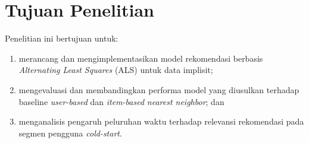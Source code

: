 \section{Tujuan Penelitian}
Penelitian ini bertujuan untuk:
\begin{enumerate}
  \item merancang dan mengimplementasikan model rekomendasi berbasis
    \emph{Alternating Least Squares} (ALS) untuk data implisit;
  \item mengevaluasi dan membandingkan performa model yang diusulkan
    terhadap baseline \emph{user-based} dan \emph{item-based} \emph{nearest
    neighbor}; dan
  \item menganalisis pengaruh peluruhan waktu terhadap relevansi
    rekomendasi pada segmen pengguna \emph{cold-start}.
\end{enumerate}
